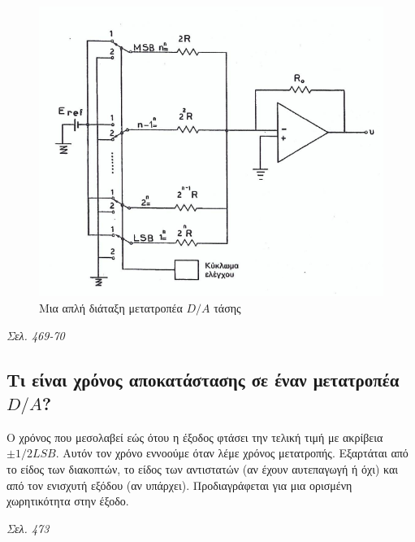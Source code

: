 \documentclass{article}
\begin{document}
\begin{figure}
    \includegraphics[width=\linewidth]{DAtashs.png}
    \caption{Μια απλή διάταξη μετατροπέα $D/A$ τάσης}
    \label{DAtashs}
\end{figure}

\emph{Σελ. 469-70}

\subsection{Τι είναι χρόνος αποκατάστασης σε έναν μετατροπέα $D/A$?}
Ο χρόνος που μεσολαβεί εώς ότου η έξοδος φτάσει την τελική τιμή με ακρίβεια $\pm1/2LSB$. Aυτόν τον χρόνο εννοούμε όταν λέμε χρόνος μετατροπής. Εξαρτάται από το είδος
των διακοπτών, το είδος των αντιστατών (αν έχουν αυτεπαγωγή ή όχι) και από τον ενισχυτή εξόδου (αν υπάρχει). Προδιαγράφεται για μια ορισμένη χωρητικότητα στην έξοδο.

\emph{Σελ. 473}
\end{document}
